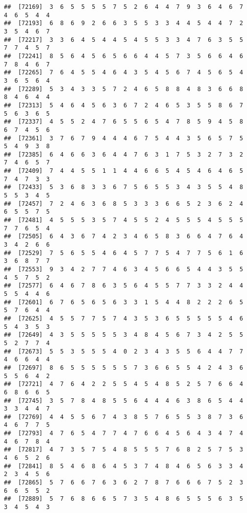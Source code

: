 \documentclass[
]{book}
\begin{document}
\begin{verbatim}
##  [72169]  3  6  5  5  5  5  7  5  2  6  4  4  7  9  3  6  4  6  7  4  6  5  4  4
##  [72193]  6  8  6  9  2  6  6  3  5  5  3  3  4  4  5  4  4  7  2  3  5  4  6  7
##  [72217]  3  3  6  4  5  4  4  5  4  5  5  3  3  4  7  6  3  5  5  7  7  4  5  7
##  [72241]  8  5  6  4  5  6  5  6  6  4  4  5  7  3  5  6  6  4  6  7  8  4  6  7
##  [72265]  7  6  4  5  5  4  6  4  3  5  4  5  6  7  4  5  6  5  4  3  6  5  6  4
##  [72289]  5  3  4  3  3  5  7  2  4  6  5  8  8  4  8  3  6  6  8  8  4  6  4  4
##  [72313]  5  4  6  4  5  6  3  6  7  2  4  6  5  3  5  5  8  6  7  5  6  3  6  5
##  [72337]  4  5  5  2  4  7  6  5  5  6  5  4  7  8  5  9  4  5  8  6  7  4  5  6
##  [72361]  3  7  6  7  9  4  4  4  6  7  5  4  4  3  5  6  5  7  5  5  4  9  3  8
##  [72385]  6  4  6  6  3  6  4  4  7  6  3  1  7  5  3  2  7  3  2  7  4  6  5  7
##  [72409]  7  4  4  5  5  1  1  4  4  6  6  5  4  5  4  6  4  6  5  7  4  7  3  3
##  [72433]  5  3  6  8  3  3  6  7  5  6  5  5  3  4  3  5  5  4  8  5  5  3  4  5
##  [72457]  7  2  4  6  3  6  8  5  3  3  3  6  6  5  2  3  6  2  4  6  5  5  7  5
##  [72481]  4  5  5  5  3  5  7  4  5  5  2  4  5  5  5  4  5  5  5  7  7  6  5  4
##  [72505]  6  4  3  6  7  4  2  3  4  6  5  8  3  6  6  4  7  6  4  3  4  2  6  6
##  [72529]  7  5  6  5  5  4  6  4  5  7  7  5  4  7  7  5  6  1  6  3  6  8  7  7
##  [72553]  9  3  4  2  7  7  4  6  3  4  5  6  6  5  4  4  3  5  5  4  5  7  5  2
##  [72577]  6  4  6  7  8  6  3  5  6  4  5  5  7  7  3  3  2  4  4  5  5  4  4  6
##  [72601]  6  7  6  5  6  5  6  3  3  1  5  4  4  8  2  2  2  6  5  5  7  6  4  4
##  [72625]  4  5  5  7  7  5  7  4  3  5  3  6  5  5  5  5  5  4  6  5  4  3  5  3
##  [72649]  4  3  5  5  5  5  5  3  4  8  4  5  6  7  3  4  2  5  5  5  2  7  7  4
##  [72673]  5  5  3  5  5  5  4  0  2  3  4  3  5  5  6  4  4  7  7  4  6  6  4  4
##  [72697]  8  6  5  5  5  5  5  5  7  3  6  6  5  5  4  2  4  3  6  5  5  6  4  2
##  [72721]  4  7  6  4  2  2  5  5  4  5  4  8  5  2  5  7  6  6  4  6  8  6  6  5
##  [72745]  3  5  7  8  4  8  5  5  6  4  4  4  6  3  8  6  5  4  4  3  3  4  4  7
##  [72769]  4  4  5  5  6  7  4  3  8  5  7  6  5  5  3  8  7  3  6  4  6  7  7  5
##  [72793]  4  7  6  5  4  7  7  4  7  6  6  4  5  6  4  3  4  7  4  4  6  7  8  4
##  [72817]  4  7  3  5  7  5  4  8  5  5  5  7  6  8  2  5  7  5  3  4  6  5  2  6
##  [72841]  8  5  4  6  8  6  4  5  3  7  4  8  4  6  5  6  3  3  4  2  3  4  5  6
##  [72865]  5  7  6  6  7  6  3  6  2  7  8  7  6  6  6  7  5  2  3  6  6  5  5  2
##  [72889]  5  7  6  8  6  6  5  7  3  5  4  8  6  5  5  5  6  3  5  3  4  5  4  3

\end{verbatim}
\end{document}
